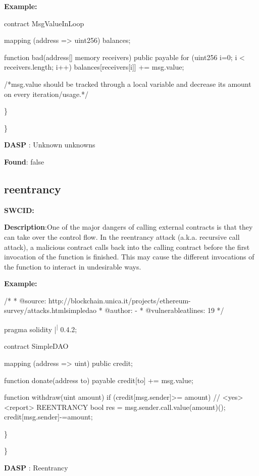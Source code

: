 \documentclass{article}
\begin{document}
\textbf{Example:} 
\begin{ffcode} 

contract MsgValueInLoop{
    mapping (address => uint256) balances;

    function bad(address[] memory receivers) public payable {
        for (uint256 i=0; i < receivers.length; i++) {
            balances[receivers[i]] += msg.value;
        }
    }
}

 /*msg.value should be tracked through a local variable and decrease its amount on every iteration/usage.*/ 

\end{ffcode} 
\} 

\} 

\textbf{DASP} : Unknown unknowns

\textbf{Found}: false

\subsection{reentrancy} 
\textbf{SWC{\textunderscore }ID:} 

\textbf{Description}:One of the major dangers of calling external contracts is that they can take over the control flow. In the reentrancy attack (a.k.a. recursive call attack), a malicious contract calls back into the calling contract before the first invocation of the function is finished. This may cause the different invocations of the function to interact in undesirable ways.


\textbf{Example:} 
\begin{ffcode} 

/*
* @source: http://blockchain.unica.it/projects/ethereum-survey/attacks.htmlsimpledao
* @author: -
* @vulnerable\textunderscore at\textunderscore lines: 19
*/

pragma solidity |\textsuperscript| 0.4.2;

contract SimpleDAO {
  mapping (address => uint) public credit;

  function donate(address to) payable {
    credit[to] += msg.value;
  }

  function withdraw(uint amount) {
    if (credit[msg.sender]>= amount) {
      // <yes> <report> REENTRANCY
      bool res = msg.sender.call.value(amount)();
      credit[msg.sender]-=amount;
    }
  }
}

\end{ffcode} 
\} 

\} 

\textbf{DASP} : Reentrancy
\end{document}
